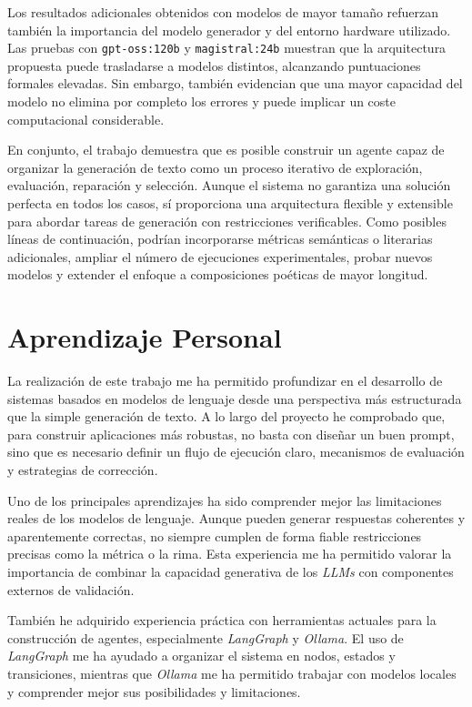 \documentclass[12pt,a4paper,twoside,openright]{book}
\begin{document}
Los resultados adicionales obtenidos con modelos de mayor tamaño refuerzan también la importancia del modelo generador y del entorno hardware utilizado. Las pruebas con \texttt{gpt-oss:120b} y \texttt{magistral:24b} muestran 
que la arquitectura propuesta puede trasladarse a modelos distintos, alcanzando puntuaciones formales elevadas. Sin embargo, también evidencian que una mayor capacidad del modelo no elimina por completo los errores y puede
implicar un coste computacional considerable.

En conjunto, el trabajo demuestra que es posible construir un agente capaz de organizar la generación de texto como un proceso iterativo de exploración, evaluación, reparación y selección. Aunque el sistema no garantiza una
solución perfecta en todos los casos, sí proporciona una arquitectura flexible y extensible para abordar tareas de generación con restricciones verificables. Como posibles líneas de continuación, podrían incorporarse métricas
semánticas o literarias adicionales, ampliar el número de ejecuciones experimentales, probar nuevos modelos y extender el enfoque a composiciones poéticas de mayor longitud.


\section{Aprendizaje Personal}

La realización de este trabajo me ha permitido profundizar en el desarrollo de sistemas basados en modelos de lenguaje desde una perspectiva más estructurada que la simple generación de texto.
A lo largo del proyecto he comprobado que, para construir aplicaciones más robustas, no basta con diseñar un buen prompt, sino que es necesario definir un flujo de ejecución claro, mecanismos de evaluación y estrategias de corrección.

Uno de los principales aprendizajes ha sido comprender mejor las limitaciones reales de los modelos de lenguaje. Aunque pueden generar respuestas coherentes y aparentemente correctas, no siempre cumplen de forma fiable
restricciones precisas como la métrica o la rima. Esta experiencia me ha permitido valorar la importancia de combinar la capacidad generativa de los \emph{LLMs} con componentes externos de validación.

También he adquirido experiencia práctica con herramientas actuales para la construcción de agentes, especialmente \emph{LangGraph} y \emph{Ollama}. El uso de \emph{LangGraph} me ha ayudado a organizar el sistema en nodos,
estados y transiciones, mientras que \emph{Ollama} me ha permitido trabajar con modelos locales y comprender mejor sus posibilidades y limitaciones.
\end{document}
